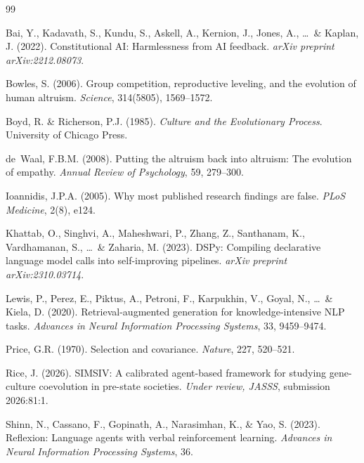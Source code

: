 \documentclass[11pt,a4paper]{article}
\begin{document}

\begin{thebibliography}{99}

Bai, Y., Kadavath, S., Kundu, S., Askell, A., Kernion, J., Jones, A., \ldots\ \& Kaplan, J. (2022).
\newblock Constitutional AI: Harmlessness from AI feedback.
\newblock \textit{arXiv preprint arXiv:2212.08073}.

Bowles, S. (2006).
\newblock Group competition, reproductive leveling, and the evolution of human altruism.
\newblock \textit{Science}, 314(5805), 1569--1572.

Boyd, R. \& Richerson, P.J. (1985).
\newblock \textit{Culture and the Evolutionary Process}.
\newblock University of Chicago Press.

de~Waal, F.B.M. (2008).
\newblock Putting the altruism back into altruism: The evolution of empathy.
\newblock \textit{Annual Review of Psychology}, 59, 279--300.

Ioannidis, J.P.A. (2005).
\newblock Why most published research findings are false.
\newblock \textit{PLoS Medicine}, 2(8), e124.

Khattab, O., Singhvi, A., Maheshwari, P., Zhang, Z., Santhanam, K., Vardhamanan, S., \ldots\ \& Zaharia, M. (2023).
\newblock DSPy: Compiling declarative language model calls into self-improving pipelines.
\newblock \textit{arXiv preprint arXiv:2310.03714}.

Lewis, P., Perez, E., Piktus, A., Petroni, F., Karpukhin, V., Goyal, N., \ldots\ \& Kiela, D. (2020).
\newblock Retrieval-augmented generation for knowledge-intensive NLP tasks.
\newblock \textit{Advances in Neural Information Processing Systems}, 33, 9459--9474.

Price, G.R. (1970).
\newblock Selection and covariance.
\newblock \textit{Nature}, 227, 520--521.

Rice, J. (2026).
\newblock SIMSIV: A calibrated agent-based framework for studying gene-culture coevolution in pre-state societies.
\newblock \textit{Under review, JASSS}, submission 2026:81:1.

Shinn, N., Cassano, F., Gopinath, A., Narasimhan, K., \& Yao, S. (2023).
\newblock Reflexion: Language agents with verbal reinforcement learning.
\newblock \textit{Advances in Neural Information Processing Systems}, 36.


\end{thebibliography}
\end{document}
